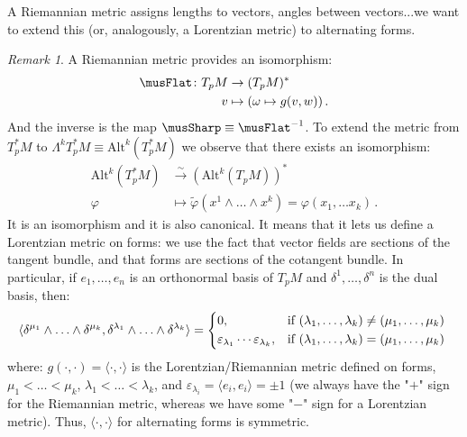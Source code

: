 \documentclass[a4paper,11pt,titlepage, article, oneside]{memoir}
\numberwithin{equation}{section}
\theoremstyle{definition}
\theoremstyle{remark}
\newtheorem{remark}[theorem]{Remark}
\begin{document}
A Riemannian metric assigns lengths to vectors, angles between vectors...we want to extend this (or, analogously, a Lorentzian metric) to alternating forms.
\newline
\begin{remarkbox} 
 \begin{remark} \label{genmetricremark} 
A Riemannian metric provides an isomorphism:
\begin{align*}
\musFlat \colon T_p M &\rightarrow (T_p M)^* \\
v &\mapsto (\omega \mapsto g(v, w)) \, .
\end{align*}
And the inverse is the map $\musSharp \equiv \musFlat^{-1}$. To extend the metric from $T_p^* M$ to $\Lambda^kT_p^* M \equiv \text{Alt}^k (T_p^* M)$ we observe that there exists an isomorphism:
\begin{align*}
\text{Alt}^k(T_p^*M) & \overset{\sim}{\longrightarrow} (\text{Alt}^k(T_p M))^* \\
\varphi &\longmapsto \tilde{\varphi} (x^1 \wedge \ldots \wedge x^k) = \varphi(x_1, \ldots x_k) \, .
\end{align*}
It is an isomorphism and it is also canonical. It means that it lets us define a Lorentzian metric on forms: we use the fact that vector fields are sections of the tangent bundle, and that forms are sections of the cotangent bundle. In particular, if $e_1, \ldots, e_n$ is an orthonormal basis of $T_pM$ and $\delta^1, \ldots, \delta^n$ is the dual basis, then:
\begin{equation*}
\langle \delta^{\mu_1} \wedge \ldots \wedge \delta^{\mu_k}, \delta^{\lambda_1}\wedge \ldots \wedge \delta^{\lambda_k} \rangle = \begin{cases*}
0, & if $(\lambda_1, \ldots, \lambda_k) \not = (\mu_1, \ldots, \mu_k)$\\
\varepsilon_{\lambda_1}\cdots \varepsilon_{\lambda_k}, &if $(\lambda_1, \ldots, \lambda_k) = (\mu_1, \ldots, \mu_k)$ 
\end{cases*}
\end{equation*}
where: $g(\cdot, \cdot) = \langle\cdot, \cdot\rangle$ is the Lorentzian/Riemannian metric defined on forms, $\mu_1 < \ldots < \mu_k$, $\lambda_1 < \ldots < \lambda_k$, and $\varepsilon_{\lambda_i}= \langle e_i, e_i \rangle = \pm1$ (we always have the "$+$" sign for the Riemannian metric, whereas we have some "$-$" sign for a Lorentzian metric). Thus, $\langle \cdot, \cdot \rangle$ for alternating forms is symmetric.
\end{remark} \end{remarkbox}
\end{document}
